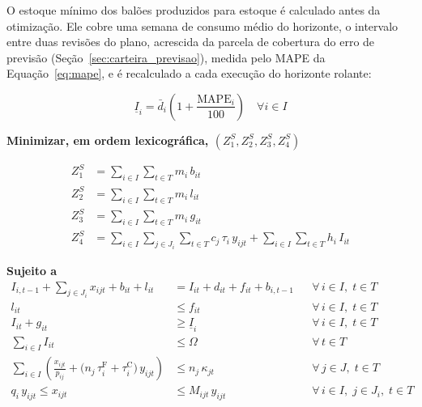\documentclass[
    12pt,
    openright,
    oneside,
    a4paper,
    fleqn,
    chapter=TITLE,
    section=TITLE,
    english,
    brazil
]{abntex2}
\begin{document}
O estoque mínimo dos balões produzidos para estoque é calculado antes da otimização. Ele cobre uma semana de consumo médio do horizonte, o intervalo entre duas revisões do plano, acrescida da parcela de cobertura do erro de previsão (Seção~\ref{sec:carteira_previsao}), medida pelo MAPE da Equação~\eqref{eq:mape}, e é recalculado a cada execução do horizonte rolante:
\begin{ceqn}
\begin{equation}
\underline{I}_{i} = \bar{d}_{i} \left( 1 + \frac{\mathrm{MAPE}_{i}}{100} \right) \quad \forall i \in I
\label{eq:estoque_minimo}
\end{equation}
\end{ceqn}

\noindent\textbf{Minimizar, em ordem lexicográfica, $(Z^{S}_{1}, Z^{S}_{2}, Z^{S}_{3}, Z^{S}_{4})$}
\begin{ceqn}
\begin{equation}
\begin{aligned}
Z^{S}_{1} &= \sum_{i \in I}\sum_{t \in T} m_{i}\, b_{it} \\
Z^{S}_{2} &= \sum_{i \in I}\sum_{t \in T} m_{i}\, l_{it} \\
Z^{S}_{3} &= \sum_{i \in I}\sum_{t \in T} m_{i}\, g_{it} \\
Z^{S}_{4} &= \sum_{i \in I}\sum_{j \in J_i}\sum_{t \in T} c_{j}\, \tau_{i}\, y_{ijt}
    + \sum_{i \in I}\sum_{t \in T} h_{i}\, I_{it}
\end{aligned}
\label{eq:obj_semanal}
\end{equation}
\end{ceqn}

\noindent\textbf{Sujeito a}
\begin{align}
I_{i,t-1} + \sum_{j \in J_i} x_{ijt} + b_{it} + l_{it}
    &= I_{it} + d_{it} + f_{it} + b_{i,t-1}
    && \forall\, i \in I,\; t \in T \label{eq:balanco} \\
l_{it} &\le f_{it}
    && \forall\, i \in I,\; t \in T \label{eq:folga_limite} \\
I_{it} + g_{it} &\ge \underline{I}_{i}
    && \forall\, i \in I,\; t \in T \label{eq:piso_estoque} \\
\sum_{i \in I} I_{it} &\le \Omega
    && \forall\, t \in T \label{eq:capacidade_armazem} \\
\sum_{i \in I} \left( \frac{x_{ijt}}{p_{ij}} + \bigl( n_{j}\, \tau^{\mathrm{F}}_{i} + \tau^{\mathrm{C}}_{i} \bigr)\, y_{ijt} \right)
    &\le n_{j}\, \kappa_{jt}
    && \forall\, j \in J,\; t \in T \label{eq:capacidade_semanal} \\
q_{i}\, y_{ijt} \le x_{ijt} &\le M_{ijt}\, y_{ijt}
    && \forall\, i \in I,\; j \in J_i,\; t \in T \label{eq:lote_minimo}
\end{align}
\end{document}
